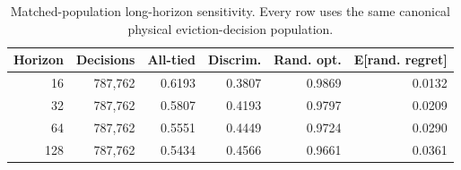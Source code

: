 \begin{table}[t]
  \centering
  \small
  \caption{Matched-population long-horizon sensitivity. Every row uses the same canonical physical eviction-decision population.}
  \label{tab:matched-long-horizon}
  \begin{tabular}{rrrrrr}
    \toprule
    Horizon & Decisions & All-tied & Discrim. & Rand. opt. & E[rand. regret] \\
    \midrule
    16 & 787,762 & 0.6193 & 0.3807 & 0.9869 & 0.0132 \\
    32 & 787,762 & 0.5807 & 0.4193 & 0.9797 & 0.0209 \\
    64 & 787,762 & 0.5551 & 0.4449 & 0.9724 & 0.0290 \\
    128 & 787,762 & 0.5434 & 0.4566 & 0.9661 & 0.0361 \\
    \bottomrule
  \end{tabular}
\end{table}
